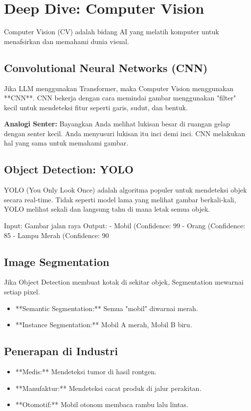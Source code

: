 \chapter{Deep Dive: Computer Vision}
\label{chap:cv}

Computer Vision (CV) adalah bidang AI yang melatih komputer untuk menafsirkan dan memahami dunia visual.

\section{Convolutional Neural Networks (CNN)}

Jika LLM menggunakan Transformer, maka Computer Vision menggunakan **CNN**. CNN bekerja dengan cara memindai gambar menggunakan "filter" kecil untuk mendeteksi fitur seperti garis, sudut, dan bentuk.

\begin{tipbox}
\textbf{Analogi Senter:}
Bayangkan Anda melihat lukisan besar di ruangan gelap dengan senter kecil. Anda menyusuri lukisan itu inci demi inci. CNN melakukan hal yang sama untuk memahami gambar.
\end{tipbox}

\section{Object Detection: YOLO}

YOLO (You Only Look Once) adalah algoritma populer untuk mendeteksi objek secara real-time. Tidak seperti model lama yang melihat gambar berkali-kali, YOLO melihat sekali dan langsung tahu di mana letak semua objek.

\begin{codeblock}[title=Konsep Output YOLO]
Input: Gambar jalan raya
Output:
- Mobil (Confidence: 99%
- Orang (Confidence: 85%
- Lampu Merah (Confidence: 90%
\end{codeblock}

\section{Image Segmentation}

Jika Object Detection membuat kotak di sekitar objek, Segmentation mewarnai setiap pixel.
\begin{itemize}
    \item **Semantic Segmentation:** Semua "mobil" diwarnai merah.
    \item **Instance Segmentation:** Mobil A merah, Mobil B biru.
\end{itemize}

\section{Penerapan di Industri}

\begin{itemize}
    \item **Medis:** Mendeteksi tumor di hasil rontgen.
    \item **Manufaktur:** Mendeteksi cacat produk di jalur perakitan.
    \item **Otomotif:** Mobil otonom membaca rambu lalu lintas.
\end{itemize}
